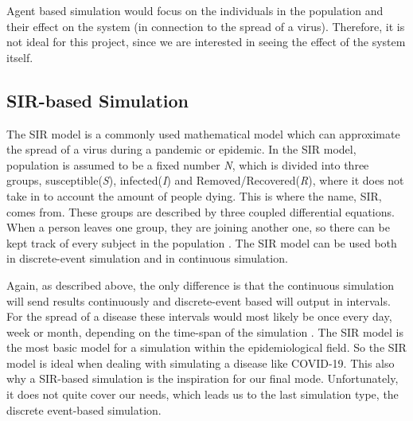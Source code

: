 Agent based simulation would focus on the individuals in the population and their effect on the system (in connection to the spread of a virus). Therefore, it is not ideal for this project, since we are interested in seeing the effect of the system itself.

\subsection{SIR-based Simulation}\label{sec: SIR-based simulation}
The SIR model is a commonly used mathematical model which can approximate the spread of a virus during a pandemic or epidemic. In the SIR model, population is assumed to be a fixed number \textit{N}, which is divided into three groups, susceptible(\textit{S}), infected(\textit{I}) and Removed/Recovered(\textit{R}), where it does not take in to account the amount of people dying. This is where the name, SIR, comes from. These groups are described by three coupled differential equations. When a person leaves one group, they are joining another one, so there can be kept track of every subject in the population \citep{smith_sir_2016}. The SIR model can be used both in discrete-event simulation and in continuous simulation. 

Again, as described above, the only difference is that the continuous simulation will send results continuously and discrete-event based will output in intervals. For the spread of a disease these intervals would most likely be once every day, week or month, depending on the time-span of the simulation \citep{ozmen_analyzing_2016}. The SIR model is the most basic model for a simulation within the epidemiological field. So the SIR model is ideal when dealing with simulating a disease like COVID-19. This also why a SIR-based simulation is the inspiration for our final mode. Unfortunately, it does not quite cover our needs, which leads us to the last simulation type, the discrete event-based simulation.




